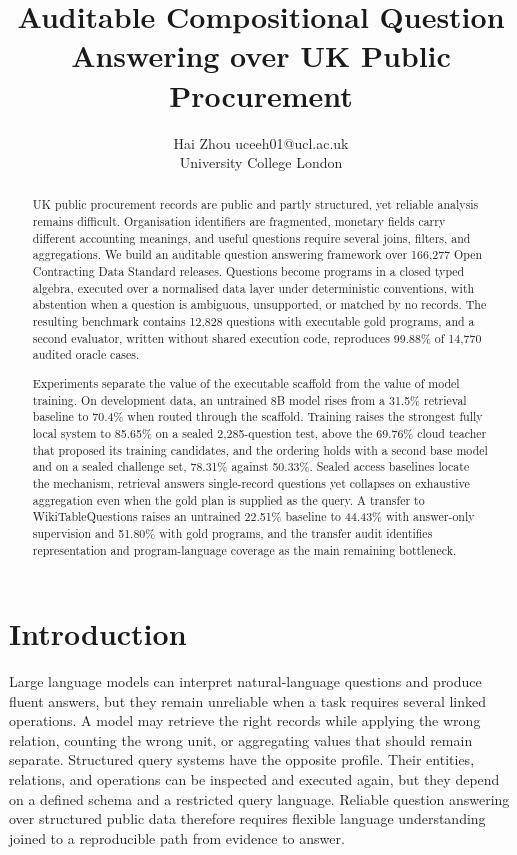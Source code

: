 \documentclass{article}
\title{Auditable Compositional Question Answering over UK Public Procurement}
\author{\name Hai Zhou \email uceeh01@ucl.ac.uk \\
 \addr University College London}
\begin{document}
\maketitle

\begin{abstract}
UK public procurement records are public and partly structured, yet
reliable analysis remains difficult. Organisation identifiers are
fragmented, monetary fields carry different accounting meanings, and useful
questions require several joins, filters, and aggregations. We build an
auditable question answering framework over 166{,}277 Open Contracting Data
Standard releases. Questions become programs in a closed typed algebra,
executed over a normalised data layer under deterministic conventions, with
abstention when a question is ambiguous, unsupported, or matched by no
records. The resulting benchmark contains 12{,}828 questions with
executable gold programs, and a second evaluator, written without shared
execution code, reproduces 99.88\% of 14{,}770 audited oracle cases.

Experiments separate the value of the executable scaffold from the value of
model training. On development data, an untrained 8B model rises from a
31.5\% retrieval baseline to 70.4\% when routed through the scaffold.
Training raises the strongest fully local system to 85.65\% on a sealed
2{,}285-question test, above the 69.76\% cloud teacher that proposed its
training candidates, and the ordering holds with a second base model and on
a sealed challenge set, 78.31\% against 50.33\%. Sealed access baselines
locate the mechanism, retrieval answers single-record questions yet
collapses on exhaustive aggregation even when the gold plan is supplied as
the query. A transfer to WikiTableQuestions raises an untrained 22.51\%
baseline to 44.43\% with answer-only supervision and 51.80\% with gold
programs, and the transfer audit identifies representation and
program-language coverage as the main remaining bottleneck.
\end{abstract}

\section{Introduction}
\label{sec:intro}

Large language models can interpret natural-language questions and produce
fluent answers, but they remain unreliable when a task requires several
linked operations. A model may retrieve the right records while applying
the wrong relation, counting the wrong unit, or aggregating values that
should remain separate. Structured query systems have the opposite
profile. Their entities, relations, and operations can be inspected and
executed again, but they depend on a defined schema and a restricted query
language. Reliable question answering over structured public data
therefore requires flexible language understanding joined to a
reproducible path from evidence to answer.
\end{document}
